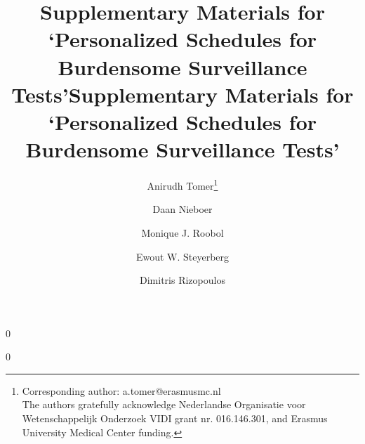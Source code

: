 \documentclass[12pt]{article}
\newcommand{\blind}{0}
\begin{document}
%

\def\spacingset#1{\renewcommand{\baselinestretch}%
{#1}\small\normalsize} \spacingset{1}



\blind
{
  \title{\bf Supplementary Materials for `Personalized Schedules for Burdensome Surveillance Tests'}

\author[1]{Anirudh Tomer\footnote{Corresponding author: a.tomer@erasmusmc.nl\\The authors gratefully acknowledge Nederlandse Organisatie voor Wetenschappelijk Onderzoek VIDI grant nr. 016.146.301, and Erasmus University Medical Center funding.}}
\author[2]{Daan Nieboer}
\author[3]{Monique J. Roobol}
\author[2,4]{Ewout W. Steyerberg}
\author[1]{Dimitris Rizopoulos}




  \maketitle
} \fi

\blind
{
 \title{\bf Supplementary Materials for `Personalized Schedules for Burdensome Surveillance Tests'}
\author{}
\date{\vspace{-2cm}}
\maketitle
} \fi

\newpage
\spacingset{1.5} %


\clearpage

\clearpage

\clearpage

\clearpage




\end{document}
